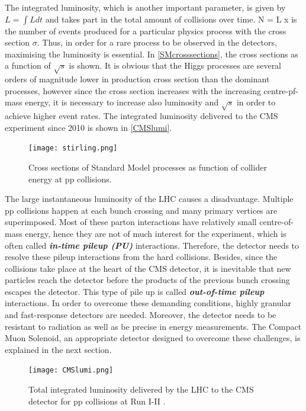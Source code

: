 The integrated luminosity, which is another important parameter, is given by $L = \int L dt$ and takes part in the total amount of collisions over time.
\be
N = L x \sigma
\ee
is the number of events produced for a particular physics process with the cross section $\sigma$. Thus, in order for a rare process to be observed in the detectors, maximising the luminosity is essential. In \autoref{SMcrosssections}, the cross sections as a function of $\sqrt{s}$ is shown. It is obvious that the Higgs processes are several orders of magnitude lower in production cross section than the dominant processes, however since the cross section increases with the increasing centre-pf-mass energy, it is necessary to increase also luminosity and $\sqrt{s}$ in order to achieve higher event rates. The integrated luminosity delivered to the CMS experiment since 2010 is shown in \autoref{CMSlumi}.
\begin{figure}[ht]
	\centering
	\texttt{[image: stirling.png]}
	\vspace{2mm}
	\caption[Cross sections of Standard Model processes as function of collider energy at pp collisions.]
	{Cross sections of Standard Model processes as function of collider energy at pp collisions\cite{stirling}.}
	\label{SMcrosssections}
\end{figure}

The large instantaneous luminosity of the LHC causes a disadvantage. Multiple pp collisions happen at each bunch crossing and many primary vertices are superimposed. Most of these parton interactions have relatively small centre-of-mass energy, hence they are not of much interest for the experiment, which is often called \textbf{\emph{in-time pileup (PU)}} interactions. Therefore, the detector needs to resolve these pileup interactions from the hard collisions. Besides, since the collisions take place at the heart of the CMS detector, it is inevitable that new particles reach the detector before the products of the previous bunch crossing escapes the detector. This type of pile up is called \textbf{\emph{out-of-time pileup}} interactions. In order to overcome these demanding conditions, highly granular and fast-response detectors are needed. Moreover, the detector needs to be resistant to radiation as well as be precise in energy measurements. The Compact Muon Solenoid, an appropriate detector designed to overcome these challenges, is explained in the next section.

\begin{figure}[ht]
	\centering
	\texttt{[image: CMSlumi.png]}
	\vspace{2mm}
	\caption[Total integrated luminosity delivered by the LHC to the CMS detector for pp collisions at Run I-II.]
	{Total integrated luminosity delivered by the LHC to the CMS detector for pp collisions at Run I-II \cite{CMSlumi}.}
	\label{CMSlumi}
\end{figure}

